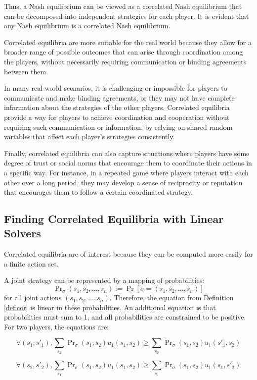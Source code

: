 \documentclass[preprint,12pt,authoryear,doubleblind]{elsarticle}
\theoremstyle{definition}
\begin{document}
Thus, a Nash equilibrium can be viewed as a correlated Nash equilibrium that can be decomposed into independent strategies for each player. It is evident that any Nash equilibrium is a correlated Nash equilibrium.

Correlated equilibria are more suitable for the real world because they allow for a broader range of possible outcomes that can arise through coordination among the players, without necessarily requiring communication or binding agreements between them.

In many real-world scenarios, it is challenging or impossible for players to communicate and make binding agreements, or they may not have complete information about the strategies of the other players. Correlated equilibria provide a way for players to achieve coordination and cooperation without requiring such communication or information, by relying on shared random variables that affect each player's strategies consistently.

Finally, correlated equilibria can also capture situations where players have some degree of trust or social norms that encourage them to coordinate their actions in a specific way. For instance, in a repeated game where players interact with each other over a long period, they may develop a sense of reciprocity or reputation that encourages them to follow a certain coordinated strategy.

\subsection{Finding Correlated Equilibria with Linear Solvers}
\label{sec:linear}
Correlated equilibria are of interest because they can be computed more easily for a finite action set.

A joint strategy can be represented by a mapping of probabilities: $$\Pr\nolimits_\sigma(s_1, s_2, \ldots, s_n) := \Pr[\sigma = (s_1, s_2, \ldots, s_n)]$$ for all joint actions $(s_1, s_2, \ldots, s_n)$. Therefore, the equation from Definition \ref{def:cor} is linear in these probabilities. An additional equation is that probabilities must sum to 1, and all probabilities are constrained to be positive. For two players, the equations are:

$$\forall (s_1, s'_1), \sum_{s_2} \Pr\nolimits_\sigma(s_1, s_2) u_1(s_1, s_2) \ge \sum_{s_2} \Pr\nolimits_\sigma(s_1, s_2) u_1(s'_1, s_2)$$

$$\forall (s_2, s'_2), \sum_{s_1} \Pr\nolimits_\sigma(s_1, s_2) u_1(s_1, s_2) \ge \sum_{s_1} \Pr\nolimits_\sigma(s_1, s_2) u_1(s_1, s'_2)$$
\end{document}

